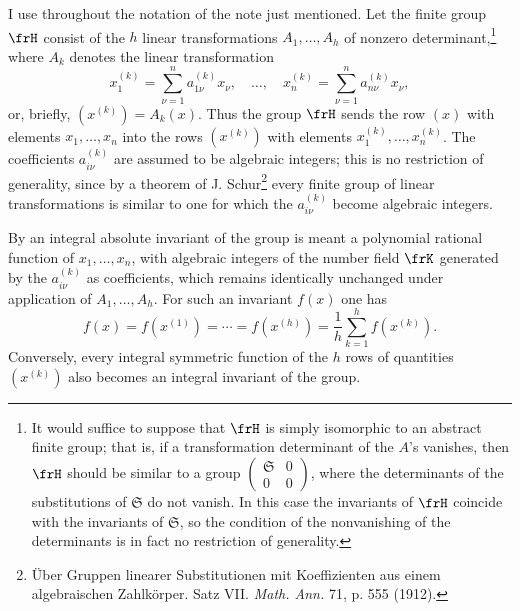 \documentclass[11pt]{article}
\providecommand{\frS}{\mathfrak S}
\begin{document}
I use throughout the notation of the note just mentioned. Let the finite group \(\frH\) consist of the \(h\) linear transformations \(A_1,\ldots,A_h\) of nonzero determinant,\footnote{It would suffice to suppose that \(\frH\) is simply isomorphic to an abstract finite group; that is, if a transformation determinant of the \(A\)'s vanishes, then \(\frH\) should be similar to a group \(\begin{pmatrix}\frS&0\\0&0\end{pmatrix}\), where the determinants of the substitutions of \(\frS\) do not vanish. In this case the invariants of \(\frH\) coincide with the invariants of \(\frS\), so the condition of the nonvanishing of the determinants is in fact no restriction of generality.} where \(A_k\) denotes the linear transformation
\[
        x_1^{(k)}=\sum_{\nu=1}^{n}a_{1\nu}^{(k)}x_\nu,
        \quad\ldots,\quad
        x_n^{(k)}=\sum_{\nu=1}^{n}a_{n\nu}^{(k)}x_\nu,
\]
or, briefly, \((x^{(k)})=A_k(x)\). Thus the group \(\frH\) sends the row \((x)\) with elements \(x_1,\ldots,x_n\) into the rows \((x^{(k)})\) with elements \(x_1^{(k)},\ldots,x_n^{(k)}\). The coefficients \(a_{i\nu}^{(k)}\) are assumed to be algebraic integers; this is no restriction of generality, since by a theorem of J. Schur\footnote{Über Gruppen linearer Substitutionen mit Koeffizienten aus einem algebraischen Zahlkörper. Satz VII. \emph{Math. Ann.} 71, p. 555 (1912).} every finite group of linear transformations is similar to one for which the \(a_{i\nu}^{(k)}\) become algebraic integers.

By an integral absolute invariant of the group is meant a polynomial rational function of \(x_1,\ldots,x_n\), with algebraic integers of the number field \(\frK\) generated by the \(a_{i\nu}^{(k)}\) as coefficients, which remains identically unchanged under application of \(A_1,\ldots,A_h\). For such an invariant \(f(x)\) one has
\begin{equation}
        f(x)=f(x^{(1)})=\cdots=f(x^{(h)})
        =\frac1h\sum_{k=1}^{h}f(x^{(k)}).
\end{equation}
Conversely, every integral symmetric function of the \(h\) rows of quantities \((x^{(k)})\) also becomes an integral invariant of the group.
\end{document}
